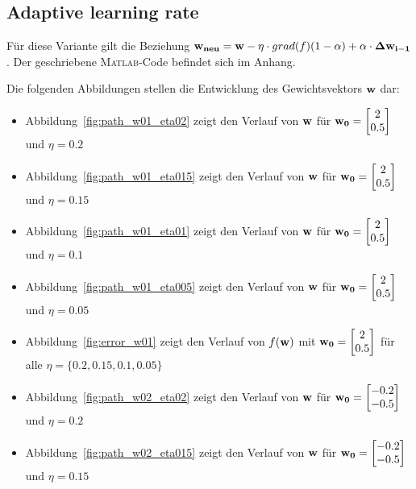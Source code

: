 \clearpage
\newpage
\subsection{Adaptive learning rate}

Für diese Variante gilt die Beziehung $ \mathbf{w_{neu}} = \mathbf{w} - \eta \cdot grad(f)(1-\alpha) +  \alpha \cdot \mathbf{\Delta w_{i-1}}$. Der geschriebene \textsc{Matlab}-Code befindet sich im Anhang.

Die folgenden Abbildungen stellen die Entwicklung des Gewichtsvektors $\mathbf{w}$ dar:

\begin{itemize}
  \item Abbildung~\ref{fig:path_w01_eta02} zeigt den Verlauf von $\mathbf{w}$ für $\mathbf{w_0} = \begin{bmatrix} 2 \\ 0.5 \end{bmatrix}$ und $\eta = 0.2$
  \item Abbildung~\ref{fig:path_w01_eta015} zeigt den Verlauf von $\mathbf{w}$ für $\mathbf{w_0} = \begin{bmatrix} 2 \\ 0.5 \end{bmatrix}$ und $\eta = 0.15$
  \item Abbildung~\ref{fig:path_w01_eta01} zeigt den Verlauf von $\mathbf{w}$ für $\mathbf{w_0} = \begin{bmatrix} 2 \\ 0.5 \end{bmatrix}$ und $\eta = 0.1$
  \item Abbildung~\ref{fig:path_w01_eta005} zeigt den Verlauf von $\mathbf{w}$ für $\mathbf{w_0} = \begin{bmatrix} 2 \\ 0.5 \end{bmatrix}$ und $\eta = 0.05$
  \item Abbildung~\ref{fig:error_w01} zeigt den Verlauf von $f(\mathbf{w})$ mit $\mathbf{w_0} = \begin{bmatrix} 2 \\ 0.5 \end{bmatrix}$ für alle $\eta = \{0.2, 0.15, 0.1, 0.05\}$
  \item Abbildung~\ref{fig:path_w02_eta02} zeigt den Verlauf von $\mathbf{w}$ für $\mathbf{w_0} = \begin{bmatrix} -0.2 \\ -0.5 \end{bmatrix}$ und $\eta = 0.2$
  \item Abbildung~\ref{fig:path_w02_eta015} zeigt den Verlauf von $\mathbf{w}$ für $\mathbf{w_0} = \begin{bmatrix} -0.2 \\ -0.5 \end{bmatrix}$ und $\eta = 0.15$

\end{itemize}
